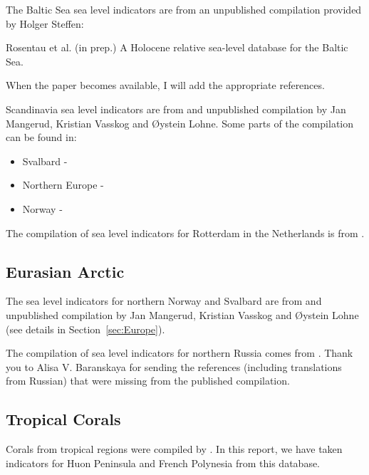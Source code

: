\label{sec:Europe}

The Baltic Sea sea level indicators are from an unpublished compilation provided by Holger Steffen:

Rosentau et al. (in prep.) A Holocene relative sea-level database for the Baltic Sea.

When the paper becomes available, I will add the appropriate references.

Scandinavia sea level indicators are from and unpublished compilation by Jan Mangerud, Kristian Vasskog and \O{}ystein Lohne. Some parts of the compilation can be found in:

\begin{itemize}
  \item Svalbard - \citet{BondevikEtal1995}
  \item Northern Europe - \citet{FormanEtal2004}
  \item Norway - \citet{LohneEtal2007,RomundsetEtal2010,RomundsetEtal2011,RomundsetEtal2015,RomundsetEtal2018,VasskogEtal2019}
\end{itemize}

The compilation of sea level indicators for Rotterdam in the Netherlands is from \citet{HijmaCohen2019}.


\subsection{Eurasian Arctic}

The sea level indicators for northern Norway and Svalbard are from and unpublished compilation by Jan Mangerud, Kristian Vasskog and \O{}ystein Lohne (see details in Section~\ref{sec:Europe}).

The compilation of sea level indicators for northern Russia comes from \citet{BaranskayaEtal2018}. Thank you to Alisa V. Baranskaya for sending the references (including translations from Russian) that were missing from the published compilation.

\subsection{Tropical Corals}

Corals from tropical regions were compiled by \citet{HibbertEtal2016}. In this report, we have taken indicators for Huon Peninsula and French Polynesia from this database.

